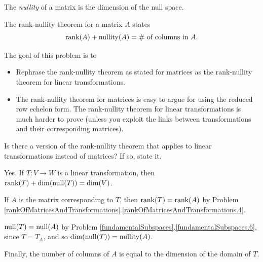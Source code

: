 \documentclass{workbook}
\newcommand{\displayonlynewpage}{\begin{displayonly}\newpage\end{displayonly}}
\newcommand{\bookonlynewpage}{\begin{bookonly}\newpage\end{bookonly}}
\begin{document}
\begin{slide}
	\bookonlynewpage
	\displayonlynewpage
	\begin{theorem}
	The \emph{nullity} of a matrix is the dimension of the null space.

	The rank-nullity theorem for a matrix $A$ states
	\[
		\operatorname{rank}(A)+\operatorname{nullity}(A) = \#\text{ of columns in }A.
	\]
	\end{theorem}

	\question
	\begin{annotation}
		\begin{goals}

			The goal of this problem is to
			\begin{itemize}
				\item Rephrase the rank-nullity theorem as stated for matrices as
					the rank-nullity theorem for linear transformations.
			\end{itemize}
		\end{goals}

		\begin{notes}
			\begin{itemize}
				\item The rank-nullity theorem for matrices is easy to argue for using
					the reduced row echelon form. The rank-nullity theorem for
					linear transformations is much harder to prove (unless you exploit
					the links between transformations and their corresponding matrices).
			\end{itemize}
		\end{notes}
	\end{annotation}
	\begin{parts}
		\item Is there a version of the rank-nullity theorem that applies to linear
			transformations instead of matrices? If so, state it.
			\begin{solution}
				Yes. If $T:V\to W$ is a linear transformation, then
				$\operatorname{rank}(T)+\operatorname{dim}(\operatorname{null}(T))=\operatorname{dim}(V)$.

				If $A$ is the matrix corresponding to $T$, then $\operatorname{rank}(T)=\operatorname{rank}(A)$
				by Problem \ref{rankOfMatricesAndTransformations}.\ref{rankOfMatricesAndTransformations.4}.

				$\operatorname{null}(T)=\operatorname{null}(A)$ by Problem \ref{fundamentalSubspaces}.\ref{fundamentalSubspaces.6},
				since $T=T_A$, and so $\operatorname{dim}(\operatorname{null}(T))=\operatorname{nullity}(A)$.

				Finally, the number of columns of $A$ is equal to the dimension
				of the domain of $T$.
			\end{solution}
	\end{parts}
\end{slide}
\end{document}
